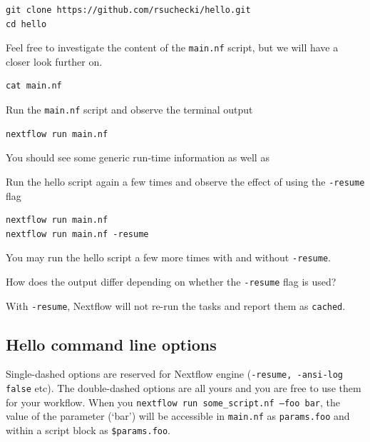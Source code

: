 \begin{steps}
\begin{lstlisting}
git clone https://github.com/rsuchecki/hello.git
cd hello
\end{lstlisting}

Feel free to investigate the content of the \texttt{main.nf} script, but we will have a closer look further on.

\begin{lstlisting}
cat main.nf
\end{lstlisting}

Run the \texttt{main.nf} script and observe the terminal output

\begin{lstlisting}
nextflow run main.nf 
\end{lstlisting}

You should see some generic run-time information as well as 

Run the hello script again a few times and observe the effect of using the \texttt{-resume} flag

\begin{lstlisting}
nextflow run main.nf 
nextflow run main.nf -resume
\end{lstlisting}
\end{steps}

You may run the hello script a few more times with and without \texttt{-resume}.

\begin{questions}
How does the output differ depending on whether the \texttt{-resume} flag is used?
\begin{answer}
With \texttt{-resume}, Nextflow will not re-run the tasks and report them as \texttt{cached}. 
\end{answer}
\end{questions}

\newpage

\subsection{Hello command line options}

Single-dashed options are reserved for Nextflow engine (\texttt{-resume, -ansi-log false} etc). 
The double-dashed options are all yours and you are free to use them for your workflow. 
When you \texttt{nextflow run some\_script.nf --foo bar}, 
the value of the parameter (`bar')
will be accessible in \texttt{main.nf} as \texttt{params.foo}
and within a script block as \texttt{\$params.foo}.



